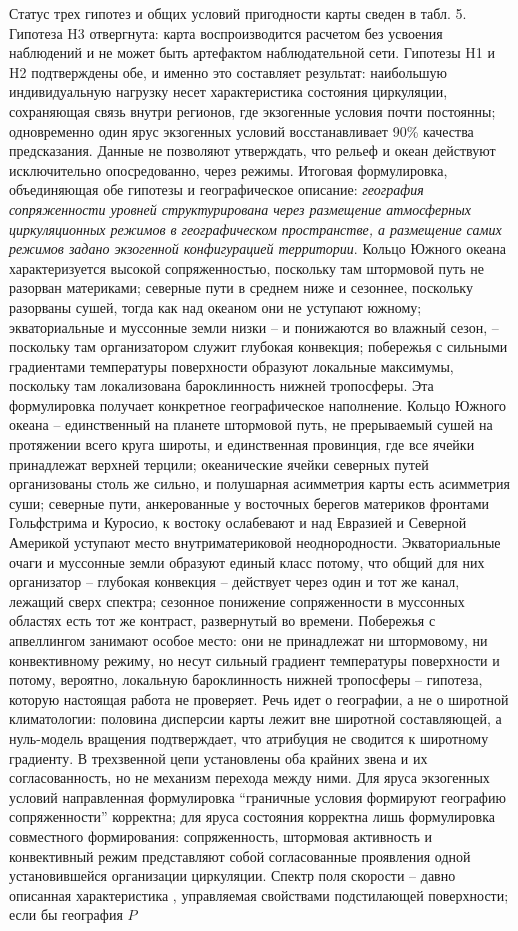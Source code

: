 \documentclass[12pt,a4paper]{article}
\begin{document}
Статус трех гипотез и общих условий пригодности карты сведен в табл. 5. Гипотеза H3 отвергнута: карта воспроизводится расчетом без усвоения наблюдений и не может быть артефактом наблюдательной сети. Гипотезы H1 и H2 подтверждены обе, и именно это составляет результат: наибольшую индивидуальную нагрузку несет характеристика состояния циркуляции, сохраняющая связь внутри регионов, где экзогенные условия почти постоянны; одновременно один ярус экзогенных условий восстанавливает 90\% качества предсказания. Данные не позволяют утверждать, что рельеф и океан действуют исключительно опосредованно, через режимы. Итоговая формулировка, объединяющая обе гипотезы и географическое описание: \emph{география сопряженности уровней структурирована через размещение атмосферных циркуляционных режимов в географическом пространстве, а размещение самих режимов задано экзогенной конфигурацией территории}. Кольцо Южного океана характеризуется высокой сопряженностью, поскольку там штормовой путь не разорван материками; северные пути в среднем ниже и сезоннее, поскольку разорваны сушей, тогда как над океаном они не уступают южному; экваториальные и муссонные земли низки -- и понижаются во влажный сезон, -- поскольку там организатором служит глубокая конвекция; побережья с сильными градиентами температуры поверхности образуют локальные максимумы, поскольку там локализована бароклинность нижней тропосферы. Эта формулировка получает конкретное географическое наполнение. Кольцо Южного океана -- единственный на планете штормовой путь, не прерываемый сушей на протяжении всего круга широты, и единственная провинция, где все ячейки принадлежат верхней терцили; океанические ячейки северных путей организованы столь же сильно, и полушарная асимметрия карты есть асимметрия суши; северные пути, анкерованные у восточных берегов материков фронтами Гольфстрима и Куросио, к востоку ослабевают и над Евразией и Северной Америкой уступают место внутриматериковой неоднородности. Экваториальные очаги и муссонные земли образуют единый класс потому, что общий для них организатор -- глубокая конвекция -- действует через один и тот же канал, лежащий сверх спектра; сезонное понижение сопряженности в муссонных областях есть тот же контраст, развернутый во времени. Побережья с апвеллингом занимают особое место: они не принадлежат ни штормовому, ни конвективному режиму, но несут сильный градиент температуры поверхности и потому, вероятно, локальную бароклинность нижней тропосферы -- гипотеза, которую настоящая работа не проверяет. Речь идет о географии, а не о широтной климатологии: половина дисперсии карты лежит вне широтной составляющей, а нуль-модель вращения подтверждает, что атрибуция не сводится к широтному градиенту. В трехзвенной цепи установлены оба крайних звена и их согласованность, но не механизм перехода между ними. Для яруса экзогенных условий направленная формулировка “граничные условия формируют географию сопряженности” корректна; для яруса состояния корректна лишь формулировка совместного формирования: сопряженность, штормовая активность и конвективный режим представляют собой согласованные проявления одной установившейся организации циркуляции. Спектр поля скорости -- давно описанная характеристика \cite{NastromGage1985,Lovejoy2011}, управляемая свойствами подстилающей поверхности; если бы география $P$ 
\end{document}
